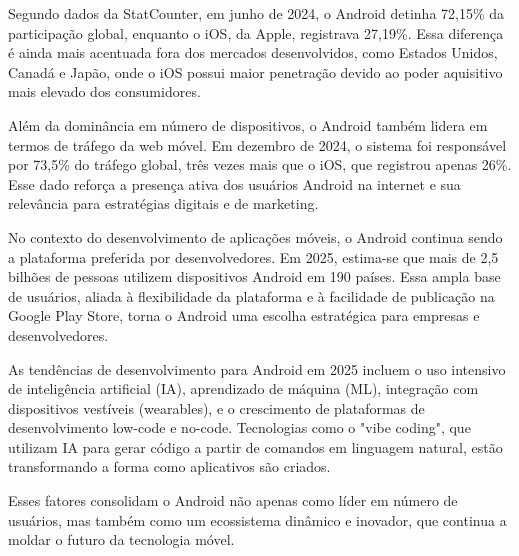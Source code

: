 Segundo dados da StatCounter, em junho de 2024, o Android detinha 72,15\% da participação global, enquanto o iOS, da Apple, registrava 27,19\%\cite{infobae2024}. Essa diferença é ainda mais acentuada fora dos mercados desenvolvidos, como Estados Unidos, Canadá e Japão, onde o iOS possui maior penetração devido ao poder aquisitivo mais elevado dos consumidores.

Além da dominância em número de dispositivos, o Android também lidera em termos de tráfego da web móvel. Em dezembro de 2024, o sistema foi responsável por 73,5\% do tráfego global, três vezes mais que o iOS, que registrou apenas 26\%\cite{tiinside2025}. Esse dado reforça a presença ativa dos usuários Android na internet e sua relevância para estratégias digitais e de marketing.

No contexto do desenvolvimento de aplicações móveis, o Android continua sendo a plataforma preferida por desenvolvedores. Em 2025, estima-se que mais de 2,5 bilhões de pessoas utilizem dispositivos Android em 190 países\cite{solguruz2025}. Essa ampla base de usuários, aliada à flexibilidade da plataforma e à facilidade de publicação na Google Play Store, torna o Android uma escolha estratégica para empresas e desenvolvedores.

As tendências de desenvolvimento para Android em 2025 incluem o uso intensivo de inteligência artificial (IA), aprendizado de máquina (ML), integração com dispositivos vestíveis (wearables), e o crescimento de plataformas de desenvolvimento low-code e no-code. Tecnologias como o "vibe coding", que utilizam IA para gerar código a partir de comandos em linguagem natural, estão transformando a forma como aplicativos são criados\cite{solguruz2025}.

Esses fatores consolidam o Android não apenas como líder em número de usuários, mas também como um ecossistema dinâmico e inovador, que continua a moldar o futuro da tecnologia móvel.

\begin{comment}
Dados estatísticos revelam a significativa penetração do sistema Android no mercado mundial de sistemas operacionais. Segundo levantamento conduzido pela StatCounter Global Stats \cite{statcounter2017}, empresa especializada em pesquisas e análises estatísticas de mercado tecnológico, em março de 2017, os usuários do Android representavam 37,93\% da atividade global em redes, superando ligeiramente o sistema Windows, que registrou 37,91\% no mesmo período. Estes números consolidaram o Android como o sistema operacional mais utilizado mundialmente, marcando um ponto de inflexão significativo no panorama tecnológico global.

No âmbito do desenvolvimento de aplicações móveis, pesquisa conduzida entre programadores durante o período de abril a maio de 2013 evidenciou que 71\% dos desenvolvedores direcionavam seus esforços para a plataforma Android \cite{developereconomics2013}. Esta preferência dos desenvolvedores reflete tanto a popularidade do sistema quanto as oportunidades de mercado que a plataforma oferece.
\end{comment}

